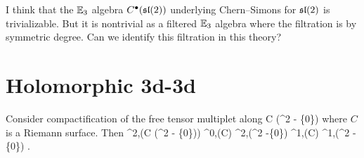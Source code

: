 \documentclass[11pt]{amsart}
\begin{document}
I think that the $\mathbb E_3$ algebra $C^\bullet(\mathfrak{sl}(2))$ underlying Chern--Simons for $\mathfrak{sl}(2)$ is trivializable.
But it is nontrivial as a filtered $\mathbb E_3$ algebra where the filtration is by symmetric degree.
Can we identify this filtration in this theory?



\section{Holomorphic 3d-3d}

Consider compactification of the free tensor multiplet along
\beqn
C \times (\C^2 - \{0\})
\eeqn 
where $C$ is a Riemann surface.
Then
\beqn
\Omega^{2,\bu}(C \times (\C^2 - \{0\})) \simeq \Omega^{0,\bu}(C) \otimes \Omega^{2,\bu}(\C^2 -\{0\}) \oplus \Omega^{1,\bu}(C) \otimes \Omega^{1,\bu}(\C^2 - \{0\}) .
\eeqn
\end{document}
